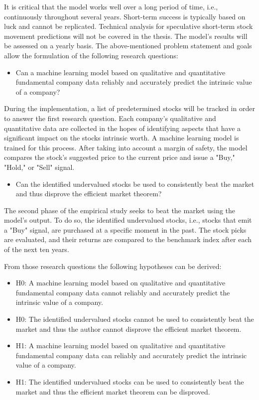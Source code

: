\documentclass{imc-inf}
\begin{document}
It is critical that the model works well over a long period of time, i.e., continuously throughout several years. Short-term success is typically based on luck and cannot be replicated. Technical analysis for speculative short-term stock movement predictions will not be covered in the thesis. The model's results will be assessed on a yearly basis.
The above-mentioned problem statement and goals allow the formulation of the following research questions:

\begin{itemize}
	\item Can a machine learning model based on qualitative and quantitative fundamental company data reliably and accurately predict the intrinsic value of a company?
\end{itemize}

During the implementation, a list of predetermined stocks will be tracked in order to answer the first research question. Each company's qualitative and quantitative data are collected in the hopes of identifying aspects that have a significant impact on the stocks intrinsic worth. A machine learning model is trained for this process. After taking into account a margin of safety, the model compares the stock's suggested price to the current price and issue a "Buy," "Hold," or "Sell" signal.

\begin{itemize}
	\item Can the identified undervalued stocks be used to consistently beat the market and thus disprove the efficient market theorem?
\end{itemize}

The second phase of the empirical study seeks to beat the market using the model's output. To do so, the identified undervalued stocks, i.e., stocks that emit a "Buy" signal, are purchased at a specific moment in the past. The stock picks are evaluated, and their returns are compared to the benchmark index after each of the next ten years.

From those research questions the following hypotheses can be derived:

\begin{itemize}
	\item H0: A machine learning model based on qualitative and quantitative fundamental company data cannot reliably and accurately predict the intrinsic value of a company.
	\item H0: The identified undervalued stocks cannot be used to consistently beat the market and thus the author cannot disprove the efficient market theorem.
	\item H1: A machine learning model based on qualitative and quantitative fundamental company data can reliably and accurately predict the intrinsic value of a company.
	\item H1: The identified undervalued stocks can be used to consistently beat the market and thus the efficient market theorem can be disproved.
\end{itemize}
\end{document}
